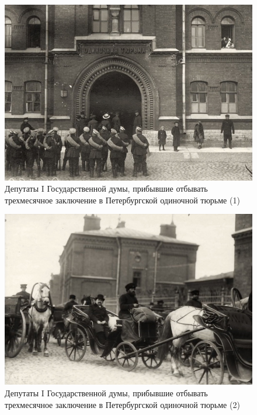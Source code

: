 \begin{figure}[h!tb] 
	\centering\includegraphics[scale=0.5]{Vozzvanie/isxQLVpDpX4.jpg}
	\caption{Депутаты I Государственной думы, прибывшие отбывать трехмесячное заключение в Петербургской одиночной тюрьме (1)
	}%
\end{figure}
\begin{figure}[h!tb] 
	\centering\includegraphics[scale=0.5]{Vozzvanie/cg8Te3zFzOQ.jpg}
	\caption{Депутаты I Государственной думы, прибывшие отбывать трехмесячное заключение в Петербургской одиночной тюрьме (2)
	}%
\end{figure}
